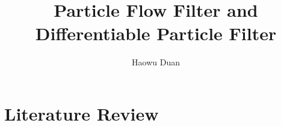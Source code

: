 \documentclass{article}
\begin{document}
\title{Particle Flow Filter and Differentiable Particle Filter}

\author{Haowu Duan}





\maketitle

\tableofcontents

\newpage
\section{Literature Review}
\end{document}
